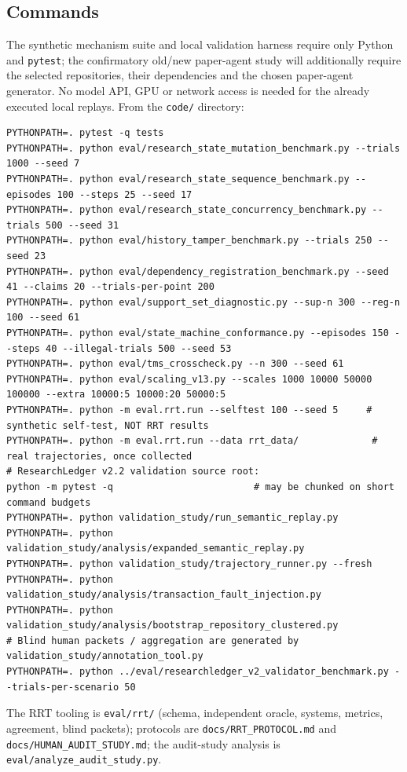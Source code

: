 \documentclass[journal]{IEEEtran}
\begin{document}
\subsection{Commands}
The synthetic mechanism suite and local validation harness require only Python and \texttt{pytest}; the confirmatory old/new paper-agent study will additionally require the selected repositories, their dependencies and the chosen paper-agent generator. No model API, GPU or network access is needed for the already executed local replays. From the \texttt{code/} directory:
\begin{lstlisting}[basicstyle=\scriptsize\ttfamily,breaklines=true]
PYTHONPATH=. pytest -q tests
PYTHONPATH=. python eval/research_state_mutation_benchmark.py --trials 1000 --seed 7
PYTHONPATH=. python eval/research_state_sequence_benchmark.py --episodes 100 --steps 25 --seed 17
PYTHONPATH=. python eval/research_state_concurrency_benchmark.py --trials 500 --seed 31
PYTHONPATH=. python eval/history_tamper_benchmark.py --trials 250 --seed 23
PYTHONPATH=. python eval/dependency_registration_benchmark.py --seed 41 --claims 20 --trials-per-point 200
PYTHONPATH=. python eval/support_set_diagnostic.py --sup-n 300 --reg-n 100 --seed 61
PYTHONPATH=. python eval/state_machine_conformance.py --episodes 150 --steps 40 --illegal-trials 500 --seed 53
PYTHONPATH=. python eval/tms_crosscheck.py --n 300 --seed 61
PYTHONPATH=. python eval/scaling_v13.py --scales 1000 10000 50000 100000 --extra 10000:5 10000:20 50000:5
PYTHONPATH=. python -m eval.rrt.run --selftest 100 --seed 5     # synthetic self-test, NOT RRT results
PYTHONPATH=. python -m eval.rrt.run --data rrt_data/             # real trajectories, once collected
# ResearchLedger v2.2 validation source root:
python -m pytest -q                         # may be chunked on short command budgets
PYTHONPATH=. python validation_study/run_semantic_replay.py
PYTHONPATH=. python validation_study/analysis/expanded_semantic_replay.py
PYTHONPATH=. python validation_study/trajectory_runner.py --fresh
PYTHONPATH=. python validation_study/analysis/transaction_fault_injection.py
PYTHONPATH=. python validation_study/analysis/bootstrap_repository_clustered.py
# Blind human packets / aggregation are generated by validation_study/annotation_tool.py
PYTHONPATH=. python ../eval/researchledger_v2_validator_benchmark.py --trials-per-scenario 50
\end{lstlisting}
The RRT tooling is \texttt{eval/rrt/} (schema, independent oracle, systems, metrics, agreement, blind packets); protocols are \texttt{docs/RRT\_PROTOCOL.md} and \texttt{docs/HUMAN\_AUDIT\_STUDY.md}; the audit-study analysis is \texttt{eval/analyze\_audit\_study.py}.

\printbibliography
\end{document}
